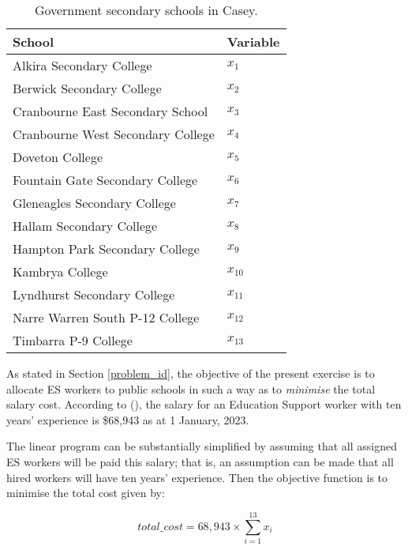 \documentclass[11pt, a4paper]{article}
\begin{document}
    \begin{table}[!ht]
        \centering
        \caption{Government secondary schools in Casey.}
        \begin{tabular}{|l|l|}
            \hline
            School & Variable \\ \hline
            Alkira Secondary College & $x_1$ \\ \hline
            Berwick Secondary College & $x_2$ \\ \hline
            Cranbourne East Secondary School & $x_3$ \\ \hline
            Cranbourne West Secondary College & $x_4$ \\ \hline
            Doveton College & $x_5$ \\ \hline
            Fountain Gate Secondary College & $x_6$ \\ \hline
            Gleneagles Secondary College & $x_7$ \\ \hline
            Hallam Secondary College & $x_8$ \\ \hline
            Hampton Park Secondary College & $x_9$ \\ \hline
            Kambrya College & $x_{10}$ \\ \hline
            Lyndhurst Secondary College & $x_{11}$ \\ \hline
            Narre Warren South P-12 College & $x_{12}$ \\ \hline
            Timbarra P-9 College & $x_{13}$ \\ \hline
        \end{tabular}
        \label{dec_vars}
    \end{table}
    
    As stated in Section \ref{problem_id}, the objective of the present exercise is to allocate ES workers to public schools in such a way as to \textit{minimise} the total salary cost. According to  (), the salary for an Education Support worker with ten years' experience is \$68,943 as at 1 January, 2023.

    The linear program can be substantially simplified by assuming that all assigned ES workers will be paid this salary; that is, an assumption can be made that all hired workers will have ten years' experience. Then the objective function is to minimise the total cost given by:

    \begin{equation}
        total\_cost = 68,943 \times \sum_{i=1}^{13} x_i
    \end{equation}
\end{document}
